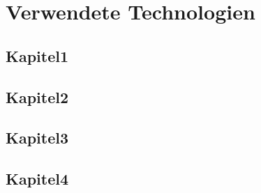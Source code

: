 \chapter{Verwendete Technologien}
\section{Kapitel1}
\section{Kapitel2}
\section{Kapitel3}
\section{Kapitel4}